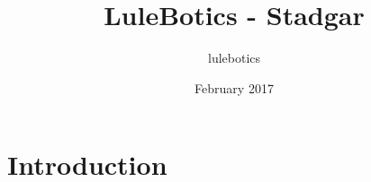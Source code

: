 \documentclass{article}
\title{LuleBotics - Stadgar}
\author{lulebotics }
\date{February 2017}
\begin{document}
\maketitle

\section{Introduction}
\end{document}
